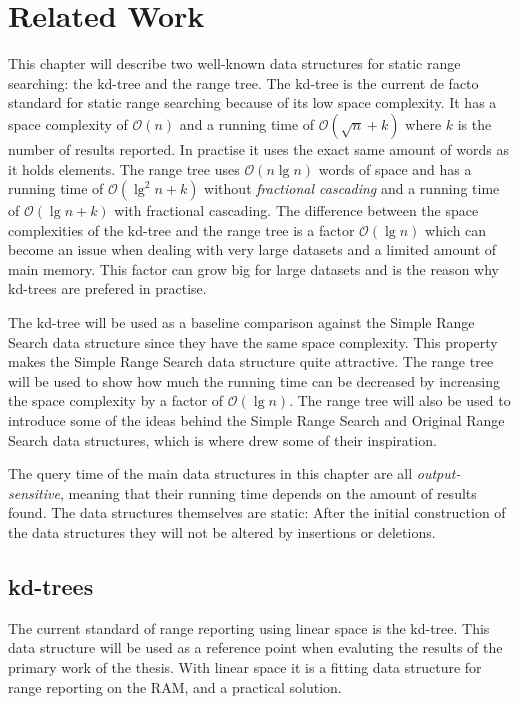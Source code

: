 \chapter{Related Work}
\label{ch:relatedwork}

This chapter will describe two well-known data structures for static range searching: the kd-tree and the range tree. The kd-tree is the current de facto standard for static range searching because of its low space complexity. It has a space complexity of $\mathcal{O}(n)$ and a running time of $\mathcal{O}(\sqrt{n} + k)$ where $k$ is the number of results reported. In practise it uses the exact same amount of words as it holds elements. The range tree uses $\mathcal{O}(n \lg n)$ words of space and has a running time of $\mathcal{O}(\lg^2 n + k)$ without \emph{fractional cascading} and a running time of $\mathcal{O}(\lg n + k)$ with fractional cascading. The difference between the space complexities of the kd-tree and the range tree is a factor $\mathcal{O}(\lg n)$ which can become an issue when dealing with very large datasets and a limited amount of main memory. This factor can grow big for large datasets and is the reason why kd-trees are prefered in practise.

The kd-tree will be used as a baseline  comparison against the Simple Range Search data structure since they have the same space complexity. This property makes the Simple Range Search data structure quite attractive. The range tree will be used to show how much the running time can be decreased by increasing the space complexity by a factor of $\mathcal{O}(\lg n)$. The range tree will also be used to introduce some of the ideas behind the Simple Range Search and Original Range Search data structures, which is where \citet{chanetal} drew some of their inspiration.

The query time of the main data structures in this chapter are all \emph{output-sensitive}, meaning that their running time depends on the amount of results found. The data structures themselves are static: After the initial construction of the data structures they will not be altered by insertions or deletions.  

\section{kd-trees}
\label{sect:kdtrees}

The current standard of range reporting using linear space is the kd-tree. This data structure will be used as a reference point when evaluting the results of the primary work of the thesis. With linear space it is a fitting data structure for range reporting on the RAM, and a practical solution.

